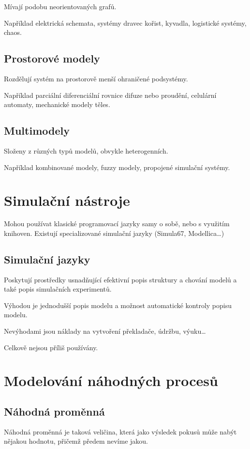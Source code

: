 \documentclass[11pt]{article}
\begin{document}
Mívají podobu neorientovaných grafů.

Například elektrická schemata, systémy dravec kořist, kyvadla, logistické
systémy, chaos.

\subsection{Prostorové modely}
\label{sec:org7ff923a}
Rozdělují systém na prostorově menší ohraničené podsystémy.

Například parciální diferenciální rovnice difuze nebo proudění, celulární
automaty, mechanické modely těles.

\subsection{Multimodely}
\label{sec:orge31f870}
Složeny z různých typů modelů, obvykle heterogenních.

Například kombinované modely, fuzzy modely, propojené simulační systémy.
\section{Simulační nástroje}
\label{sec:orgfc9b30f}
Mohou používat klasické programovací jazyky samy o sobě, nebo s využitím
knihoven. Existují specializované simulační jazyky (Simula67, Modellica\ldots{})

\subsection{Simulační jazyky}
\label{sec:org785e86d}
Poskytují prostředky usnadňující efektivní popis struktury a chování modelů a
také popis simulačních experimentů.

Výhodou je jednodušší popis modelu a možnost automatické kontroly popisu modelu.

Nevýhodami jsou náklady na vytvoření překladače, údržbu, výuku\ldots{}

Celkově nejsou příliš používány.

\section{Modelování náhodných procesů}
\label{sec:orgb5c09a2}
\subsection{Náhodná proměnná}
\label{sec:orgf9a2294}
Náhodná proměnná je taková veličina, která jako výsledek pokusů může nabýt
nějakou hodnotu, přičemž předem nevíme jakou.
\end{document}
